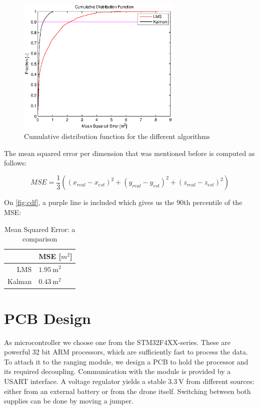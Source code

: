 \documentclass[a4paper]{article}        %
\begin{document}
			\begin{figure}[H]
				\centering
				\includegraphics[width=0.7\textwidth]{images/cdf_algorithms.eps}
				\caption{Cumulative distribution function for the different algorithms}
				\label{fig:cdf}
			\end{figure}

The mean squared error per dimension that was mentioned before is computed as follows:

\begin{equation}
MSE = \dfrac{1}{3}((x_{real}-x_{est})^2+(y_{real}-y_{est})^2+(z_{real}-z_{est})^2)
\end{equation}

On \autoref{fig:cdf}, a purple line is included which gives us the 90th percentile of the MSE:

\begin{table}[H]
\begin{center}
\begin{tabular}{ | r | l | }
    \hline
     & MSE [$m^2$] \\ \hline
    LMS & $\SI{1.95}{\square\meter}$ \\ \hline
    Kalman & $\SI{0.43}{\square\meter}$ \\
    \hline
\end{tabular}
\end{center}
\caption{Mean Squared Error: a comparison}
\label{table:MSE}
\end{table}

\section{PCB Design}


  As microcontroller we choose one from the STM32F4XX-series. These are powerful 32 bit ARM processors, which are sufficiently fast to process the data.
  To attach it to the ranging module, we design a PCB to hold the processor and its required decoupling. Communication with the module is provided by a USART interface.
  A voltage regulator yields a stable $\SI{3.3}{\volt}$ from different sources: either from an external battery or from the drone itself. Switching between both supplies can be done by moving a jumper.
\end{document}
